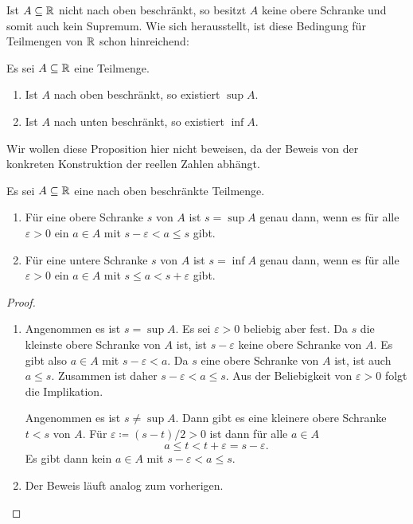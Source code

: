 \documentclass[a4paper,10pt]{article}
\begin{document}
Ist $A \subseteq \mathbb{R}$ nicht nach oben beschränkt, so besitzt $A$ keine obere Schranke und somit auch kein Supremum. Wie sich herausstellt, ist diese Bedingung für Teilmengen von $\mathbb{R}$ schon hinreichend:


\begin{prop}
 Es sei $A \subseteq \mathbb{R}$ eine Teilmenge.
 \begin{enumerate}
  \item
   Ist $A$ nach oben beschränkt, so existiert $\sup A$.
  \item
   Ist $A$ nach unten beschränkt, so existiert $\inf A$.
 \end{enumerate}
\end{prop}


Wir wollen diese Proposition hier nicht beweisen, da der Beweis von der konkreten Konstruktion der reellen Zahlen abhängt.


\begin{lem}
 Es sei $A \subseteq \mathbb{R}$ eine nach oben beschränkte Teilmenge.
 \begin{enumerate}
  \item
   Für eine obere Schranke $s$ von $A$ ist $s = \sup A$ genau dann, wenn es für alle $\varepsilon > 0$ ein $a \in A$ mit $s-\varepsilon < a \leq s$ gibt.
  \item
   Für eine untere Schranke $s$ von $A$ ist $s = \inf A$ genau dann, wenn es für alle $\varepsilon > 0$ ein $a \in A$ mit $s \leq a < s + \varepsilon$ gibt.
 \end{enumerate}
\end{lem}
\begin{proof}
 \begin{enumerate}
  \item
   Angenommen es ist $s = \sup A$. Es sei $\varepsilon > 0$ beliebig aber fest. Da $s$ die kleinste obere Schranke von $A$ ist, ist $s-\varepsilon$ keine obere Schranke von $A$. Es gibt also $a \in A$ mit $s-\varepsilon < a$. Da $s$ eine obere Schranke von $A$ ist, ist auch $a \leq s$. Zusammen ist daher $s-\varepsilon < a \leq s$. Aus der Beliebigkeit von $\varepsilon > 0$ folgt die Implikation.
   
   Angenommen es ist $s \neq \sup A$. Dann gibt es eine kleinere obere Schranke $t < s$ von $A$. Für $\varepsilon \coloneqq (s-t)/2 > 0$ ist dann für alle $a \in A$
   \[
    a \leq t < t + \varepsilon = s - \varepsilon.
   \]
   Es gibt dann kein $a \in A$ mit $s-\varepsilon < a \leq s$.
  \item
   Der Beweis läuft analog zum vorherigen.
 \end{enumerate}

\end{proof}
\end{document}
